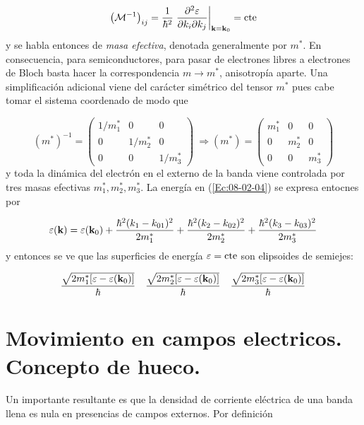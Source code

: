 \begin{equation}
	\left( \mathcal{M}^{-1} \right)_{ij} = \frac{1}{\hbar^2} \left. \frac{\partial ^2 \varepsilon}{\partial  k_i \partial k_j} \right|_{\mathbf{k}=\mathbf{k}_0} = \text{cte}
\end{equation}
y se habla entonces de \textit{masa efectiva}, denotada generalmente por $m^*$. En consecuencia, para semiconductores, para pasar de electrones libres a electrones de Bloch basta hacer la correspondencia $m\rightarrow m^*$, anisotropía aparte. Una simplificación adicional viene del carácter simétrico del tensor $m^*$ pues cabe tomar el sistema coordenado de modo que

\begin{equation}
	(m^*)^{-1} = \begin{pmatrix}
		1/m_1^* & 0 & 0 \\
		0 & 1/m_2^* & 0 \\
		0 & 0 & 1/m_3^* 
	\end{pmatrix} \ \Rightarrow (m^*) = \begin{pmatrix}
		m_1^* & 0 & 0 \\
		0 & m_2^* & 0 \\
		0 & 0 & m_3^* 
	\end{pmatrix} 
\end{equation}
y toda la dinámica del electrón en el externo de la banda viene controlada por tres masas efectivas $m_1^*,m_2^*,m_3^*$. La energía en (\ref{Ec:08-02-04}) se expresa entocnes por

\begin{equation}
	\varepsilon (\mathbf{k}) = \varepsilon (\mathbf{k}_0) + \frac{\hbar^2 (k_1-k_{01})^2}{2m_1^*} + \frac{\hbar^2 (k_2-k_{02})^2}{2m_2^*} + \frac{\hbar^2 (k_3-k_{03})^2}{2m_3^*}
\end{equation}
y entonces se ve que las superficies de energía $\varepsilon=\text{cte}$ son elipsoides de semiejes:

\begin{equation}
	\frac{\sqrt{2m_1^* [\varepsilon-\varepsilon(\mathbf{k}_0)]}}{\hbar} \quad 
	\frac{\sqrt{2m_2^* [\varepsilon-\varepsilon(\mathbf{k}_0)]}}{\hbar} \quad
	\frac{\sqrt{2m_3^* [\varepsilon-\varepsilon(\mathbf{k}_0)]}}{\hbar}
\end{equation}

\section{Movimiento en campos electricos. Concepto de hueco.}

Un importante resultante es que la densidad de corriente eléctrica de una banda llena es nula en presencias de campos externos. Por definición 

